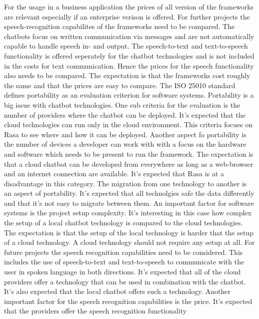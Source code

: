 For the usage in a business application the prices of all version of the frameworks are relevant 
especially if an enterprise verison is offered.
For further projects the speech-recognition capabilites of the frameworks need to be 
compared. 
The chatbots focus on written communication via messages and are not automatically capable 
to handle speech in- and output.
The speech-to-text and text-to-speech functionality is offered seperately for the 
chatbot technologies and is not included in the costs for text communication.
Hence the prices for the speech functionality also needs to be compared.
The expectation is that the frameworks cost roughly the same and that 
the prices are easy to compare.
The ISO 25010\cite{iso25010} standard defines portability as an evaluation criterion for software systems.
Portability is a big issue with chatbot technologies.
One sub criteria for the evaluation is the number of providers where the chatbot 
can be deployed.
It's expected that the cloud technologies can run only in the cloud environment.
This criteria focues on Rasa to see where and how it can be deployed.
Another aspect fo portability is the number of devices a developer can work with 
with a focus on the hardware and software which needs to be present to run the 
framework.
The expectation is that a cloud chatbot can be developed from everywhere 
as long as a web-browser and an internet connection are available.
It's expected that Rasa is at a disadvantage in this category.
The migration from one technology to another is an aspect of portability.
It's expected that all technolgies safe the data differently and that it's not 
easy to migrate between them.
An important factor for software systems is the project setup complexity.
It's interesting in this case how complex the setup of a local chatbot 
technology is compared to the cloud technologies.
The expectation is that the setup of the local technology is harder 
that the setup of a cloud technology.
A cloud technology should not require any setup at all.
For future projects the speech recognition capabilities need to be considered.
This includes the use of speech-to-text and text-to-speech to communicate with the user 
in spoken language in both directions.
It's expected that all of the cloud providers offer a 
technology that can be used in combination with the chatbot.
It's also expected that the local chatbot offers such a technology.
Another important factor for the speech recognition capabilities is the 
price.
It's expected that the providers offer the speech recognition functionality 

